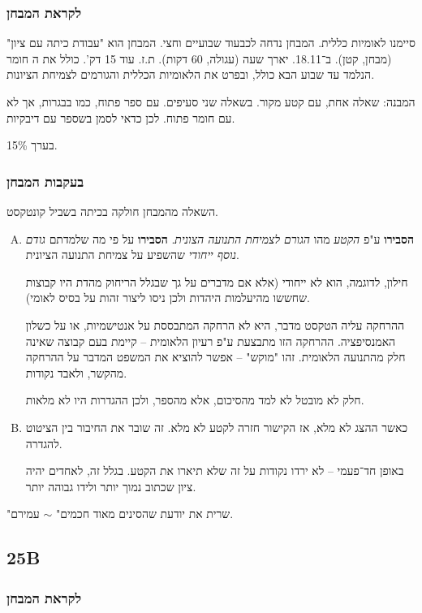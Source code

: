 \documentclass[a4paper]{book}
\begin{document}
	\subsubsection{לקראת המבחן}
	סיימנו לאומיות כללית. המבחן נדחה לכבעוד שבועיים וחצי. המבחן הוא "עבודת כיתה עם ציון" (מבחן, קטן). ב־18.11. יארך שעה (עגולה, 60 דקות). ת.ז. עוד 15 דק'. כולל את ה חומר הנלמד עד שבוע הבא כולל, ובפרט את הלאומיות הכללית והגורמים לצמיחת הציונות.
	
	המבנה: שאלה אחת, עם קטע מקור. בשאלה שני סעיפים. עם ספר פתוח, כמו בבגרות, אך לא עם חומר פתוח. לכן כדאי לסמן בשספר עם דיבקיות. 
	
	בערך 15\%. 
	
	\subsubsection{בעקבות המבחן}
	השאלה מהמבחן חולקה בכיתה בשביל קונטקסט. 
	\begin{enumerate}[A.]
		\item \textbf{הסבירו} ע"פ \textit{הקטע} מהו \textit{הגורם לצמיחת התנועה הצונית}. \textbf{הסבירו} על פי מה שלמדתם \textit{גודם נוסף ייחודי} שהשפיע על צמיחת התנועה הציונית. 
		
		חילון, לדוגמה, הוא לא ייחודי (אלא אם מדברים על גך שבגלל הריחוק מהדת היו קבוצות שחששו מהיעלמות היהדות ולכן ניסו ליצור זהות על בסיס לאומי). 
		
		ההרחקה עליה הטקסט מדבר, היא לא הרחקה המתבססת על אנטישמיות, או על כשלון האמנסיפציה. ההרחקה הזו מתבצעת ע"פ רעיון הלאומית – קיימת בעם קבוצה שאינה חלק מהתנועה הלאומית. זהו "מוקש" – אפשר להוציא את המשפט המדבר על ההרחקה מהקשר, ולאבד נקודות. 
		
		חלק לא מובטל לא למד מהסיכום, אלא מהספר, ולכן ההגדרות היו לא מלאות. 
		
		\item כאשר ההצג לא מלא, אז הקישור חזרה לקטע לא מלא. זה שובר את החיבור בין הציטוט להגדרה. 
		
		באופן חד־פעמי – לא ירדו נקודות על זה שלא תיארו את הקטע. בגלל זה, לאחדים יהיה ציון שכתוב נמוך יותר ולידו גבוהה יותר. 
		
	\end{enumerate}
	
	"שרית את יודעת שהסינים מאוד חכמים" $\sim$ עמירם. 
	
	\subsection{25B}
	\subsubsection{לקראת המבחן}
	
\end{document}

